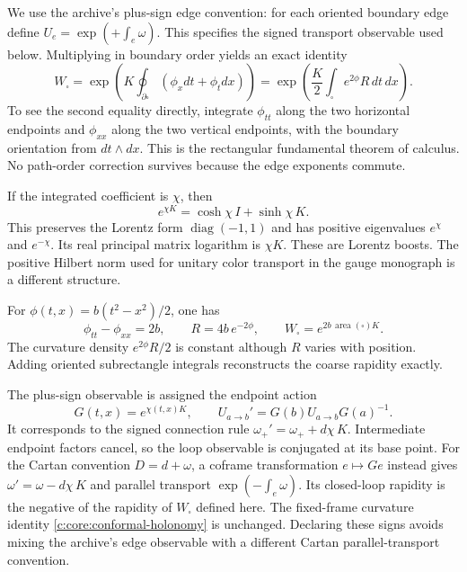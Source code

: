 We use the archive's plus-sign edge convention: for each oriented
boundary edge define $U_e=\exp(+\int_e\omega)$. This specifies the
signed transport observable used below. Multiplying in boundary order
yields an exact identity
\begin{equation}
 W_\square
 =\exp\left(K\oint_{\partial\square}(\phi_xdt+\phi_tdx)\right)
 =\exp\left(\frac K2\int_\square e^{2\phi}R\,dt\,dx\right).
 \label{c:core:conformal-holonomy}
\end{equation}
To see the second equality directly, integrate $\phi_{tt}$ along the
two horizontal endpoints and $\phi_{xx}$ along the two vertical
endpoints, with the boundary orientation from $dt\wedge dx$. This is
the rectangular fundamental theorem of calculus. No path-order
correction survives because the edge exponents commute.

If the integrated coefficient is $\chi$, then
\[
 e^{\chi K}=\cosh\chi\,I+\sinh\chi\,K.
\]
This preserves the Lorentz form $\operatorname{diag}(-1,1)$ and has
positive eigenvalues $e^{\chi}$ and $e^{-\chi}$. Its real principal
matrix logarithm is $\chi K$. These are Lorentz boosts. The positive
Hilbert norm used for unitary color transport in the gauge monograph
is a different structure.

\begin{example}
For $\phi(t,x)=b(t^2-x^2)/2$, one has
\[
 \phi_{tt}-\phi_{xx}=2b,
 \qquad R=4b\,e^{-2\phi},
 \qquad W_\square=e^{2b\,\operatorname{area}(\square)K}.
\]
The curvature density $e^{2\phi}R/2$ is constant although $R$ varies
with position. Adding oriented subrectangle integrals reconstructs
the coarse rapidity exactly.
\end{example}

The plus-sign observable is assigned the endpoint action
\[
 G(t,x)=e^{\chi(t,x)K},\qquad
 U_{a\to b}'=G(b)U_{a\to b}G(a)^{-1}.
\]
It corresponds to the signed connection rule
$\omega_+'=\omega_++d\chi\,K$. Intermediate endpoint factors cancel,
so the loop observable is conjugated at its base point. For the
Cartan convention $D=d+\omega$, a coframe transformation $e\mapsto Ge$
instead gives $\omega'=\omega-d\chi\,K$ and parallel transport
$\exp(-\int_e\omega)$. Its closed-loop rapidity is the negative of the
rapidity of $W_\square$ defined here. The fixed-frame curvature identity
\eqref{c:core:conformal-holonomy} is unchanged. Declaring these signs
avoids mixing the archive's edge observable with a different Cartan
parallel-transport convention.



